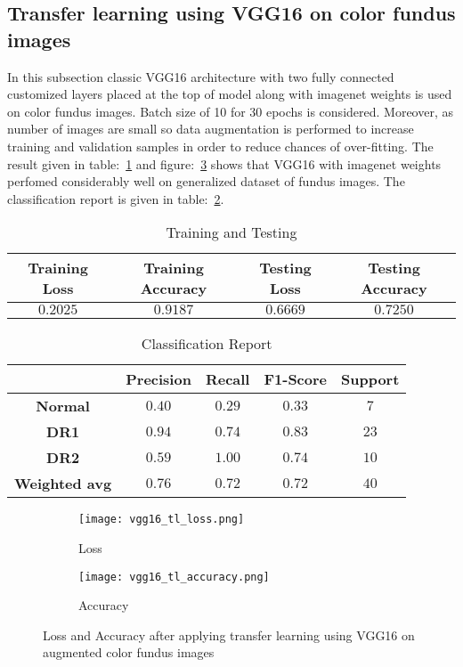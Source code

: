 \documentclass[12pt,a4paper,titlepage]{report}
\begin{document}
\subsection{Transfer learning using VGG16 on color fundus images}
In this subsection classic VGG16 architecture with two fully connected customized layers placed at the top of model along with imagenet weights is used on color fundus images. Batch size of 10 for 30 epochs is considered. Moreover, as number of images are small so data augmentation is performed to increase training and validation samples in order to reduce chances of over-fitting. The result given in table:~\ref{tab: Table-8} and figure:~\ref{fig: Image4} shows that VGG16 with imagenet weights perfomed considerably well on generalized dataset of fundus images. The classification report is given in table:~\ref{tab: Table-9}.
\vspace{30pt}
\begin{table}[H]
\centering
\caption{Training and Testing}
\label{tab: Table-8}
\begin{tabular}{c c c c}
\hline
\textbf{Training Loss} & \textbf{Training Accuracy} & \textbf{Testing Loss} & \textbf{Testing Accuracy}\\
\hline
$0.2025$ & $0.9187$ & $0.6669$ & $0.7250$\\
\hline
\end{tabular}
\end{table}
\vspace{20pt}

\begin{table}[H]
\centering
\caption{Classification Report}
\label{tab: Table-9}
\begin{tabular}{c c c c c}
\hline
\textbf{} & \textbf{Precision} & \textbf{Recall} & \textbf{F1-Score} & \textbf{Support} \\
\hline
\textbf{Normal} & $0.40$ & $0.29$ & $0.33$ & $7$\\
\textbf{DR1} & $0.94$ & $ 0.74$ & $0.83$ & $23$\\
\textbf{DR2} & $0.59$ & $1.00$ & $0.74$ & $10$\\
\textbf{Weighted avg} & $0.76$ & $0.72$ & $0.72$ & $40$\\
\hline
\end{tabular}
\end{table}

\begin{figure}[H]
\centering
\begin{subfigure}[h]{0.45\linewidth}
\texttt{[image: vgg16\_tl\_loss.png]}
\caption{Loss}
\label{fig:a}
\end{subfigure}
\quad
\begin{subfigure}[h]{0.45\linewidth}
\texttt{[image: vgg16\_tl\_accuracy.png]}
\caption{Accuracy}
\label{fig:b}
\end{subfigure}
\caption{Loss and Accuracy after applying transfer learning using VGG16 on augmented color fundus images}
\label{fig: Image4}
\end{figure}
\end{document}
